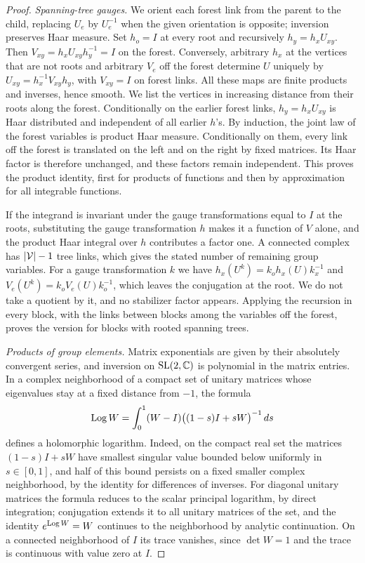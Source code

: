 \begin{proof}
\emph{Spanning-tree gauges.} We orient each forest link from the parent to the child, replacing $U_e$ by $U_e^{-1}$ when the given orientation is opposite; inversion preserves Haar measure. Set $h_o=I$ at every root and recursively $h_y=h_xU_{xy}$. Then $V_{xy}=h_xU_{xy}h_y^{-1}=I$ on the forest. Conversely, arbitrary $h_x$ at the vertices that are not roots and arbitrary $V_e$ off the forest determine $U$ uniquely by $U_{xy}=h_x^{-1}V_{xy}h_y$, with $V_{xy}=I$ on forest links. All these maps are finite products and inverses, hence smooth. We list the vertices in increasing distance from their roots along the forest. Conditionally on the earlier forest links, $h_y=h_xU_{xy}$ is Haar distributed and independent of all earlier $h$'s. By induction, the joint law of the forest variables is product Haar measure. Conditionally on them, every link off the forest is translated on the left and on the right by fixed matrices. Its Haar factor is therefore unchanged, and these factors remain independent. This proves the product identity, first for products of functions and then by approximation for all integrable functions.

If the integrand is invariant under the gauge transformations equal to $I$ at the roots, substituting the gauge transformation $h$ makes it a function of $V$ alone, and the product Haar integral over $h$ contributes a factor one. A connected complex has $\lvert \mathcal V\rvert-1$ tree links, which gives the stated number of remaining group variables. For a gauge transformation $k$ we have $h_x(U^k)=k_oh_x(U)k_x^{-1}$ and $V_e(U^k)=k_oV_e(U)k_o^{-1}$, which leaves the conjugation at the root. We do not take a quotient by it, and no stabilizer factor appears. Applying the recursion in every block, with the links between blocks among the variables off the forest, proves the version for blocks with rooted spanning trees.

\emph{Products of group elements.} Matrix exponentials are given by their absolutely convergent series, and inversion on $\mathrm{SL}(2,\mathbb C)$ is polynomial in the matrix entries. In a complex neighborhood of a compact set of unitary matrices whose eigenvalues stay at a fixed distance from $-1$, the formula
\begin{equation}\label{ch02:eq:local-log-integral}
 \operatorname{Log} W=\int_0^1(W-I)\bigl((1-s)I+sW\bigr)^{-1}\,ds
\end{equation}
defines a holomorphic logarithm. Indeed, on the compact real set the matrices $(1-s)I+sW$ have smallest singular value bounded below uniformly in $s\in[0,1]$, and half of this bound persists on a fixed smaller complex neighborhood, by the identity for differences of inverses. For diagonal unitary matrices the formula reduces to the scalar principal logarithm, by direct integration; conjugation extends it to all unitary matrices of the set, and the identity $e^{\operatorname{Log} W}=W$ continues to the neighborhood by analytic continuation. On a connected neighborhood of $I$ its trace vanishes, since $\det W=1$ and the trace is continuous with value zero at $I$.


\end{proof}
